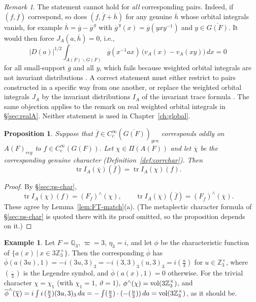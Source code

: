 \documentclass[12pt,letterpaper,openany]{book}
\theoremstyle{plain}
\newtheorem{proposition}[theorem]{Proposition}
\theoremstyle{definition}
\newtheorem{example}[theorem]{Example}
\theoremstyle{remark}
\newtheorem{remark}[theorem]{Remark}
\theoremstyle{remark}
\newcommand{\tr}{\operatorname{tr}}
\begin{document}
\begin{remark}\label{rem:weighted-noninv}
The statement cannot hold for \emph{all} corresponding pairs. Indeed, if
$(f,\overline{f})$ correspond, so does $(f,\overline{f}+\overline{h})$
for any genuine $\overline{h}$ whose orbital integrals vanish, for
example $\overline{h}=\overline{g}-\overline{g}^{\,y}$ with
$\overline{g}^{\,y}(x)=\overline{g}(yxy^{-1})$ and $y\in\overline{G(F)}$.
It would then force $J_A(a,\overline{h})=0$, i.e.,
\[
|D(a)|^{1/2}\int_{\overline{A(F)}\backslash\overline{G(F)}}
\overline{g}(x^{-1}ax)\,\bigl(v_A(x)-v_A(xy)\bigr)\,dx=0
\]
for all small-support $\overline{g}$ and all $y$, which fails because
weighted orbital integrals are not invariant distributions
\cite{A7}. A correct statement must either restrict to pairs constructed
in a specific way from one another, or replace the weighted orbital
integrals $J_A$ by the invariant distributions $I_A$ of the invariant
trace formula \cite{A6}. The same objection applies to the remark on
real weighted orbital integrals in \S\ref{sec:realA}. Neither statement
is used in Chapter~\ref{ch:global}.
\end{remark}

\begin{proposition}\label{prop:hyp-ps}
Suppose that $\overline{f}\in C^\infty_c(\overline{G(F)})_{gen}$
corresponds oddly on $A(F)_{reg}$ to
$f\in C_c^\infty(G(F))$. Let $\chi\in\Pi(A(F))$ and let $\overline{\chi}$
be the corresponding genuine character
(Definition~\ref{def:corrchar}). Then
\[
\tr I_A(\overline{\chi})(\overline{f})=\tr I_A(\chi)(f).
\]
\end{proposition}

\begin{proof}
By \S\ref{sec:ps-char},
\[
\tr I_A(\chi)(f)=(F_f)^\wedge(\chi),\qquad
\tr I_A(\overline{\chi})(\overline{f})=(F_{\overline{f}})^\wedge(\overline{\chi}).
\]
These agree by Lemma~\ref{lem:FT-match}(a). (The metaplectic character
formula of \S\ref{sec:ps-char} is quoted there with its proof omitted,
so the proposition depends on it.)
\end{proof}

\begin{example}
Let $F={\mathbb Q}_3$, $\varpi=3$, $\eta_3=i$, and let $\phi$ be the
characteristic function of $\{a(x)\ |\ x\in 3{\mathbb Z}_3^\times\}$.
Then the corresponding $\overline\phi$ has
$\overline{\phi}(a(3u),1)=-i\,(3u,3)_3=-i\,(3,3)_3(u,3)_3=i\left(\frac{u}{3}\right)$
for $u\in{\mathbb Z}_3^\times$, where $(\frac{\cdot}{3})$ is the Legendre
symbol, and $\overline\phi(a(x),1)=0$ otherwise. For the trivial character
$\chi=\chi_1$ (with $\chi_1=1$, $\vartheta=1$), $\phi^\wedge(\chi)={\rm vol}(3{\mathbb Z}_3^\times)$,
and $\overline{\phi}^\wedge(\overline\chi)
=i\int i\,(\tfrac{u}{3})(3u,3)_3\,da=-\int(\tfrac{u}{3})\cdot(-(\tfrac{u}{3}))\,da
={\rm vol}(3{\mathbb Z}_3^\times)$, as it should be.
\end{example}
\end{document}
